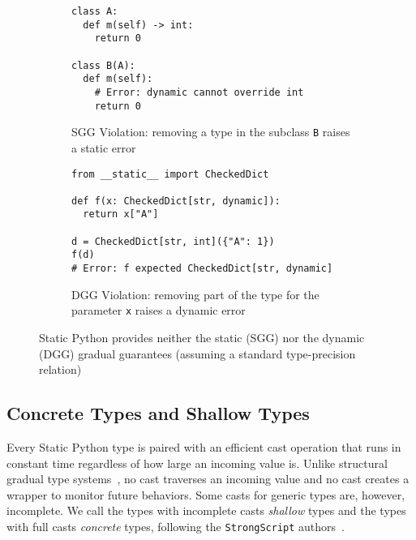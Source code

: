 \documentclass[english,cleveref,submission]{programming}
\newcommand{\SP}{Static Python}
\newcommand{\code}[1]{\texttt{#1}}
\begin{document}
\begin{figure}
  \begin{subfigure}[t]{0.48\columnwidth}
    \begin{lstlisting}
class A:
  def m(self) -> int:
    return 0

class B(A):
  def m(self):
    # Error: dynamic cannot override int
    return 0
  \end{lstlisting}
    \caption{SGG Violation: removing a type in the subclass \code{B} raises a static error}
    \label{f:gg-failure-stat}
  \end{subfigure}
  \hfill
  \begin{subfigure}[t]{0.48\columnwidth}
  \begin{lstlisting}
from __static__ import CheckedDict

def f(x: CheckedDict[str, dynamic]):
  return x["A"]

d = CheckedDict[str, int]({"A": 1})
f(d)
# Error: f expected CheckedDict[str, dynamic]
  \end{lstlisting}
    \caption{DGG Violation: removing part of the type for the parameter \code{x} raises a dynamic error}
    \label{f:gg-failure-dyn}
  \end{subfigure}
  \caption{\SP{} provides neither the static (SGG) nor the dynamic (DGG) gradual guarantees (assuming a standard type-precision relation)}
  \label{fig:gg-failure}
\end{figure}



\subsection{Concrete Types and Shallow Types}
\label{s:checked-type}

Every \SP{} type is paired with an efficient cast operation that runs in
constant time regardless of how large an incoming value is.
Unlike structural gradual type systems~\cite{gtnffvf-jfp-2019},
no cast traverses an incoming value and no cast creates a wrapper
to monitor future behaviors.
Some casts for generic types are, however, incomplete.
We call the types with incomplete casts \emph{shallow} types
and the types with full casts \emph{concrete} types, following
the \code{StrongScript} authors~\cite{rzv-ecoop-2015}.
\end{document}
